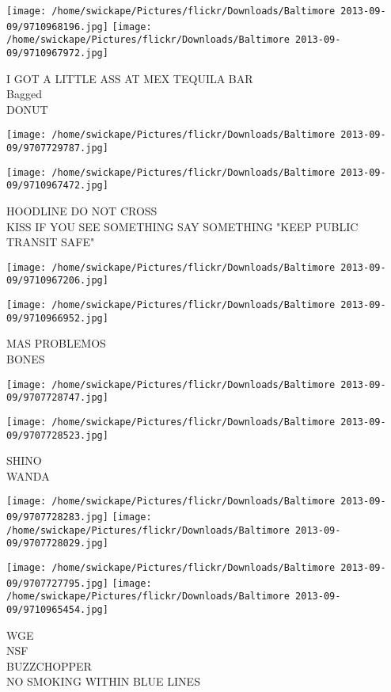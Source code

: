 \documentclass[10pt,letterpaper]{article}
\begin{document}
\vspace{0.25in}
\texttt{[image: /home/swickape/Pictures/flickr/Downloads/Baltimore 2013-09-09/9710968196.jpg]}
\texttt{[image: /home/swickape/Pictures/flickr/Downloads/Baltimore 2013-09-09/9710967972.jpg]}

I GOT A LITTLE ASS AT MEX TEQUILA BAR\\
Bagged\\
DONUT
\pagebreak

\texttt{[image: /home/swickape/Pictures/flickr/Downloads/Baltimore 2013-09-09/9707729787.jpg]}

\vspace{0.25in}
\texttt{[image: /home/swickape/Pictures/flickr/Downloads/Baltimore 2013-09-09/9710967472.jpg]}

HOODLINE DO NOT CROSS\\
KISS IF YOU SEE SOMETHING SAY SOMETHING "KEEP PUBLIC TRANSIT SAFE"
\pagebreak

\texttt{[image: /home/swickape/Pictures/flickr/Downloads/Baltimore 2013-09-09/9710967206.jpg]}

\vspace{0.25in}
\texttt{[image: /home/swickape/Pictures/flickr/Downloads/Baltimore 2013-09-09/9710966952.jpg]}

MAS PROBLEMOS\\
BONES
\pagebreak

\texttt{[image: /home/swickape/Pictures/flickr/Downloads/Baltimore 2013-09-09/9707728747.jpg]}

\vspace{0.25in}
\texttt{[image: /home/swickape/Pictures/flickr/Downloads/Baltimore 2013-09-09/9707728523.jpg]}

SHINO\\
WANDA
\pagebreak

\texttt{[image: /home/swickape/Pictures/flickr/Downloads/Baltimore 2013-09-09/9707728283.jpg]}
\texttt{[image: /home/swickape/Pictures/flickr/Downloads/Baltimore 2013-09-09/9707728029.jpg]}

\texttt{[image: /home/swickape/Pictures/flickr/Downloads/Baltimore 2013-09-09/9707727795.jpg]}
\texttt{[image: /home/swickape/Pictures/flickr/Downloads/Baltimore 2013-09-09/9710965454.jpg]}

WGE\\
NSF\\
BUZZCHOPPER\\
NO SMOKING WITHIN BLUE LINES
\pagebreak
\end{document}
